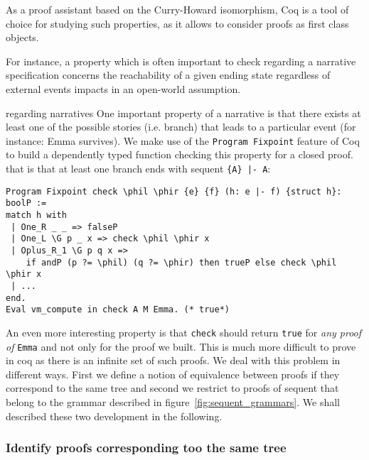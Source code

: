 \documentclass[runningheads,a4paper]{llncs}
\begin{document}
As a proof assistant based on the Curry-Howard isomorphism, Coq is a tool of choice for studying such properties, as it allows to consider proofs as first class objects.

For instance, a property which is often important to check regarding a narrative specification concerns the reachability of a given ending state regardless of external events impacts in an open-world assumption.


regarding narratives One important property of a narrative is that there exists at
least one of the possible stories (i.e. branch) that leads to a
particular event (for instance: Emma survives). We make use of the
\texttt{Program Fixpoint} feature of Coq to build a dependently typed
function checking this property for a closed proof. that is that at
least one branch ends with sequent \lstinline!{A} |- A!:
\begin{lstlisting}
Program Fixpoint check \phil \phir {e} {f} (h: e |- f) {struct h}: boolP := 
match h with
 | One_R _ _ => falseP
 | One_L \G p _ x => check \phil \phir x
 | Oplus_R_1 \G p q x =>
    if andP (p ?= \phil) (q ?= \phir) then trueP else check \phil \phir x
 | ...
end.
Eval vm_compute in check A M Emma. (* true*)
\end{lstlisting}

An even more interesting property is that \texttt{check} should return
\texttt{true} for \emph{any proof of} \texttt{Emma} and not only for
the proof we built. This is much more difficult to prove in coq as
there is an infinite set of such proofs. We deal with this problem in
different ways. First we define a notion of equivalence between proofs
if they correspond to the same tree and second we restrict to proofs
of sequent that belong to the grammar described in
figure~\ref{fig:sequent_grammars}. We shall described these two
development in the following.

\subsubsection{Identify proofs corresponding too the same tree}
\label{sec:identif-same-tree}
\end{document}
